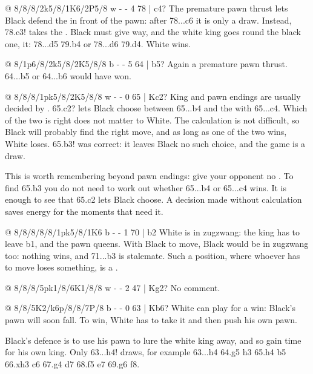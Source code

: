 
@ 8/8/8/2k5/8/1K6/2P5/8 w - - 4 78 | c4?
The premature pawn thrust lets Black defend the  in front of the pawn: after 78...\K c6 it is only a draw.
Instead, 78.\K c3! takes the . Black must give way, and the white king goes round the black one,  it: 78...\K d5 79.\K b4 or 78...\K d6 79.\K d4. White wins.

@ 8/1p6/8/2k5/8/2K5/8/8 b - - 5 64 | b5?
Again a premature pawn thrust. 64...\K b5 or 64...b6 would have won.

@ 8/8/8/1pk5/8/2K5/8/8 w - - 0 65 | Kc2?
King and pawn endings are usually decided by .
65.\K c2? lets Black choose between 65...\K b4 and the  with 65...\K c4. Which of the two is right does not matter to White. The calculation is not difficult, so Black will probably find the right move, and as long as one of the two wins, White loses.
65.\K b3! was correct: it leaves Black no such choice, and the game is a draw.\par
This is worth remembering beyond pawn endings: give your opponent no . To find 65.\K b3 you do not need to work out whether 65...\K b4 or 65...\K c4 wins. It is enough to see that 65.\K c2 lets Black choose. A decision made without calculation saves energy for the moments that need it.

@ 8/8/8/8/8/1pk5/8/1K6 b - - 1 70 | b2
White is in zugzwang: the king has to leave b1, and the pawn queens. With Black to move, Black would be in zugzwang too: nothing wins, and 71...\K b3 is stalemate. Such a position, where whoever has to move loses something, is a .

@ 8/8/8/5pk1/8/6K1/8/8 w - - 2 47 | Kg2?
No comment.

@ 8/8/5K2/k6p/8/8/7P/8 b - - 0 63 | Kb6?
White can play for a win: Black's pawn will soon fall. To win, White has to take it and then push
his own pawn.

Black's defence is to use his pawn to lure the white king away, and so gain time for his own king.
Only 63...h4! draws, for example 63...h4 64.\K g5 h3 65.\K h4 \K b5 66.\K xh3 \K c6 67.\K g4 \K d7
68.\K f5 \K e7 69.\K g6 \K f8.

